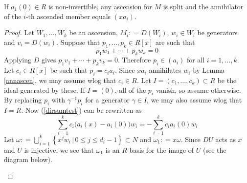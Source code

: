 \documentclass[ALCO, Unicode]{cedram}
\begin{document}
\begin{proposition}    \label{ascensionisdirect}   
If $ a_{1}(0) \in R $ is non-invertible, any ascension for $ M $  is  split  and the annihilator of the $ i $-th  ascended  member equals $ ( x a_{i} ) $. 
\end{proposition}      
\begin{proof} 
  Let $ W_{1}, \ldots , W_{k} $ be an ascension, $ M _{i} : = D(W_{i}) $,  $ w_{i} \in W_{i} $ be generators and $ v_{i} = D(w_{i}) $.    
Suppose that $ p_{1}, \ldots, p_{k} \in R[x] $ are such that 
\begin{equation} \label{dirsumtest}  p_{1} w_{1} +  \cdots + p_{k} w_{k} = 0  \end{equation}  
Applying $ D $ gives $  p_{1} v_{1} + \cdots + p_{k} v_{k} = 0 $. Therefore $ p_{i}  \in ( a_{i} ) $ for all $ i = 1, \ldots , k $. Let $ c_{i} \in R[x] $ be such that $ p_{i} = c_{i} a_{i} $. Since $ xa_{i} $ annihilates $ w_{i}  $ by Lemma \ref{annascen},  we may assume wlog that $ c_{i}   \in  R $.  Let $ I = (c_{1}, \ldots, c_{k}) \subset R $ be the ideal generated by these.  If $ I = (0) $, all of the $ p_{i} $ vanish, so assume otherwise. By replacing $ p_{i} $ with $  \gamma  ^{-1} p_{i} $ for a generator $ \gamma \in I $, we may also assume wlog  that    $ I = R $. Now (\ref{dirsumtest}) can be rewritten as
\begin{equation}  \label{dirsumtestconseq} \sum_{i=1}^{k}  c_{i} \big ( a_{i}(x) - a_{i}(0)  \big  )w_{i}  =    -  \sum_{i=1}^{k} c_{i} a_{i}(0) w_{i} 
\end{equation}   
Let $  \omega    : =  \bigcup _{ i =1 }^{k} \left \{ x^{j} w_{i} \, | \, 0 \leq j \leq d_{i}  -   1    \right \}  \subset N$ and $ \omega_{ 1 }    :   = x \omega  $.  Since $ DU $ acts as $ x $ and $ U $ is injective, we see that $ \omega  _   {  1  }   $ is an $ R $-basis for the image of $ U $ (see the diagram below).
\begin{center}
\begin{tikzcd}[ 
        ,every arrow/.append style={maps to}
        ,every label/.append style={font = \scriptsize}
] 
  

\end{tikzcd}
\end{center}
\end{proof}
\end{document}
